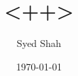\documentclass[12pt]{extarticle}
\begin{document}
\title{<++>}
\author{Syed Shah}
\date{\today}
\maketitle

\centering
\fbox{
  \texttt{[image: <++>]}
}
\end{document}
